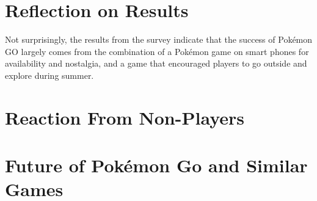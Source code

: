 \section{Reflection on Results}


Not surprisingly, the results from the survey indicate that the success of Pokémon GO largely comes from the combination of a Pokémon game on smart phones for availability and nostalgia, and a game that encouraged players to go outside and explore during summer.

\section{Reaction From Non-Players}


\section{Future of Pokémon Go and Similar Games}


